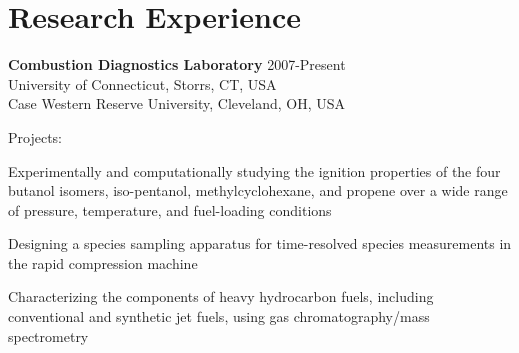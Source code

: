 \vspace{0.1in}

\section{Research Experience}

\textbf{\large Combustion Diagnostics Laboratory} \hfill 2007-Present\\
University of Connecticut, Storrs, CT, USA\\
Case Western Reserve University, Cleveland, OH, USA
\begin{outerlist}
\item[] Projects:
   \begin{innerlist}
   \item Experimentally and computationally studying the ignition
         properties of the four butanol isomers, iso-pentanol,
         methylcyclohexane, and propene over a wide range of pressure,
         temperature, and fuel-loading conditions
   \item Designing a species sampling apparatus for time-resolved
         species measurements in the rapid compression machine
   \item Characterizing the components of heavy hydrocarbon fuels,
         including conventional and synthetic jet fuels, using gas
         chromatography/mass spectrometry
   \end{innerlist}

\end{outerlist}

